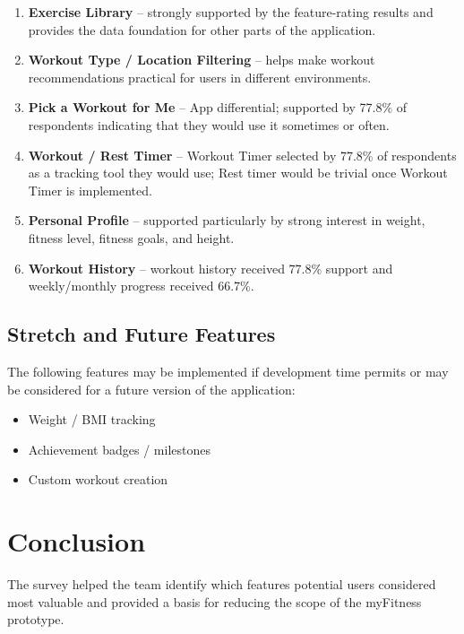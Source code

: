 \documentclass[11pt]{article}
\begin{document}
\begin{enumerate}
    \item \textbf{Exercise Library} -- strongly supported by the feature-rating results and provides the data foundation for other parts of the application.
    \item \textbf{Workout Type / Location Filtering} -- helps make workout recommendations practical for users in different environments.
    \item \textbf{Pick a Workout for Me} -- App differential; supported by 77.8\% of respondents indicating that they would use it sometimes or often.
    \item \textbf{Workout / Rest Timer} -- Workout Timer selected by 77.8\% of respondents as a tracking tool they would use; Rest timer would be trivial once Workout Timer is implemented.
    \item \textbf{Personal Profile} -- supported particularly by strong interest in weight, fitness level, fitness goals, and height.
    \item \textbf{Workout History} -- workout history received 77.8\% support and weekly/monthly progress received 66.7\%.
\end{enumerate}

\subsection{Stretch and Future Features}

The following features may be implemented if development time permits
or may be considered for a future version of the application:

\begin{itemize}
    \item Weight / BMI tracking
    \item Achievement badges / milestones
    \item Custom workout creation
\end{itemize}


\section{Conclusion}

The survey helped the team identify which features potential users considered most valuable and provided a basis for reducing the scope of the myFitness prototype.
\end{document}

